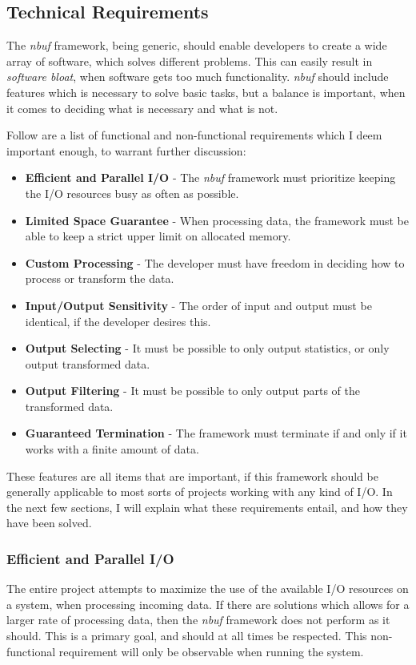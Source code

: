 \documentclass[a4paper]{article}
\newcommand{\nbuf}{\textit{nbuf} }
\begin{document}
\subsection{Technical Requirements}
The \nbuf framework, being generic, should enable developers to create a wide array of software, which solves different problems. This can easily result in \textit{software bloat}, when software gets too much functionality. \nbuf should include features which is necessary to solve basic tasks, but a balance is important, when it comes to deciding what is necessary and what is not.

Follow are a list of functional and non-functional requirements which I deem important enough, to warrant further discussion:

\begin{itemize}
\item \textbf{Efficient and Parallel I/O} - The \nbuf framework must prioritize keeping the I/O resources busy as often as possible.
\item \textbf{Limited Space Guarantee} - When processing data, the framework must be able to keep a strict upper limit on allocated memory.
\item \textbf{Custom Processing} - The developer must have freedom in deciding how to process or transform the data.
\item \textbf{Input/Output Sensitivity} - The order of input and output must be identical, if the developer desires this.
\item \textbf{Output Selecting} - It must be possible to only output statistics, or only output transformed data.
\item \textbf{Output Filtering} - It must be possible to only output parts of the transformed data.
\item \textbf{Guaranteed Termination} - The framework must terminate if and only if it works with a finite amount of data.
\end{itemize}

These features are all items that are important, if this framework should be generally applicable to most sorts of projects working with any kind of I/O. In the next few sections, I will explain what these requirements entail, and how they have been solved.

\subsubsection{Efficient and Parallel I/O}
The entire project attempts to maximize the use of the available I/O resources on a system, when processing incoming data. If there are solutions which allows for a larger rate of processing data, then the \nbuf framework does not perform as it should. This is a primary goal, and should at all times be respected. This non-functional requirement will only be observable when running the system.
\end{document}
